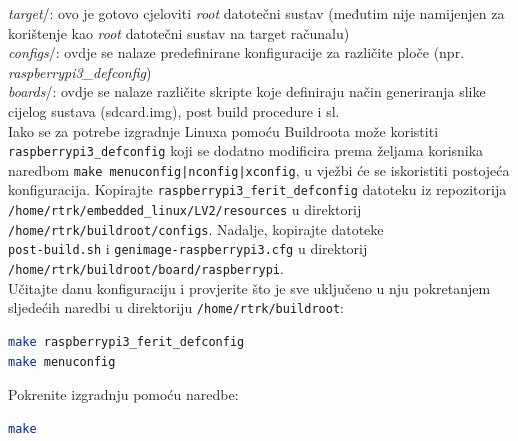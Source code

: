 \documentclass[11pt]{article}
\begin{document}
\newline
\textit{target}/: ovo je gotovo cjeloviti \textit{root} datotečni sustav
 (međutim nije namijenjen za korištenje kao \textit{root} datotečni sustav na
 target računalu)\\
\newline
\textit{configs}/: ovdje se nalaze predefinirane konfiguracije za različite
 ploče (npr. \textit{raspberrypi3\_defconfig})\\
\newline
\textit{boards}/: ovdje se nalaze različite skripte koje definiraju način
 generiranja slike cijelog sustava (sdcard.img), post build procedure i sl.\\
\newline
Iako se za potrebe izgradnje Linuxa pomoću Buildroota može koristiti\\
 \texttt{raspberrypi3\_defconfig} koji se dodatno modificira prema željama
 korisnika naredbom \texttt{make menuconfig|nconfig|xconfig}, u vježbi će se
 iskoristiti postojeća konfiguracija. Kopirajte
 \texttt{raspberrypi3\_ferit\_defconfig} datoteku iz repozitorija
 \texttt{/home/rtrk/embedded\_linux/LV2/resources} u direktorij
 \texttt{/home/rtrk/buildroot/configs}. Nadalje, kopirajte datoteke\\
 \texttt{post-build.sh} i \texttt{genimage-raspberrypi3.cfg} u direktorij\\
 \texttt{/home/rtrk/buildroot/board/raspberrypi}.\\
\newline
Učitajte danu konfiguraciju i
 provjerite što je sve uključeno u nju pokretanjem sljedećih naredbi u
 direktoriju \texttt{/home/rtrk/buildroot}:
\begin{lstlisting}[language=bash]
make raspberrypi3_ferit_defconfig
make menuconfig
\end{lstlisting}
Pokrenite izgradnju pomoću naredbe:
\begin{lstlisting}[language=bash]
make
\end{lstlisting}
\end{document}
